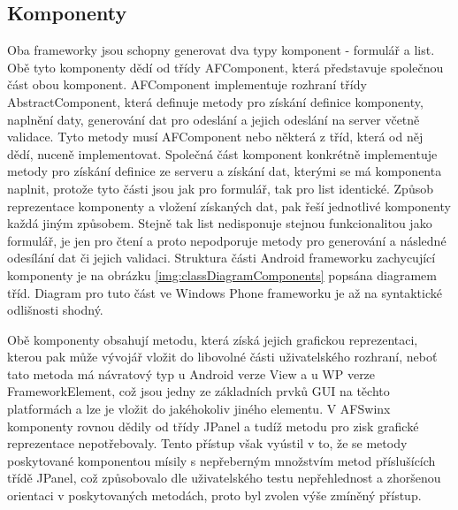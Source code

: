 \subsection{Komponenty}
Oba frameworky jsou schopny generovat dva typy komponent - formulář a list. Obě tyto komponenty dědí od třídy AFComponent, která představuje společnou část obou komponent. AFComponent implementuje rozhraní třídy AbstractComponent, která definuje metody pro získání definice komponenty, naplnění daty, generování dat pro odeslání a jejich odeslání na server včetně validace. Tyto metody musí AFComponent nebo některá z tříd, která od něj dědí, nuceně implementovat. Společná část komponent konkrétně implementuje metody pro získání definice ze serveru a získání dat, kterými se má komponenta naplnit, protože tyto části jsou jak pro formulář, tak pro list identické. Způsob reprezentace komponenty a vložení získaných dat, pak řeší jednotlivé komponenty každá jiným způsobem. Stejně tak list nedisponuje stejnou funkcionalitou jako formulář, je jen pro čtení a proto nepodporuje metody pro generování a následné odesílání dat či jejich validaci. Struktura části Android frameworku zachycující komponenty je na obrázku \ref{img:classDiagramComponents} popsána diagramem tříd. Diagram pro tuto část ve Windows Phone frameworku je až na syntaktické odlišnosti shodný.  

Obě komponenty obsahují metodu, která získá jejich grafickou reprezentaci, kterou pak může vývojář vložit do libovolné části uživatelského rozhraní, neboť tato metoda má návratový typ u Android verze View a u WP verze FrameworkElement, což jsou jedny ze základních prvků GUI na těchto platformách a lze je vložit do jakéhokoliv jiného elementu. V AFSwinx \cite{tomasek-thesis} komponenty rovnou dědily od třídy JPanel a tudíž metodu pro zisk grafické reprezentace nepotřebovaly. Tento přístup však vyústil v to, že se metody poskytované komponentou mísily s nepřeberným množstvím metod příslušících třídě JPanel, což způsobovalo dle uživatelského testu nepřehlednost a zhoršenou orientaci v poskytovaných metodách, proto byl zvolen výše zmíněný přístup. 

